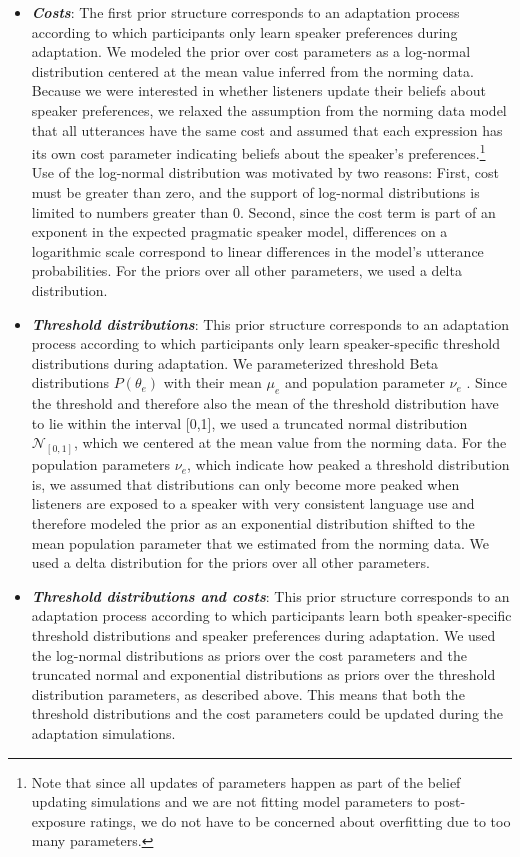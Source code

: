 \begin{itemize}
\item \textbf{\textit{Costs}}: The first prior structure corresponds to an adaptation process according to which participants only learn speaker preferences during adaptation. 
We modeled the prior over cost parameters  as a log-normal distribution centered at the mean value inferred from the norming data. Because we were interested in whether listeners update their beliefs about speaker preferences, we relaxed the assumption from the norming data model that all utterances have the same cost and assumed that each expression has its own cost parameter indicating beliefs about the speaker's preferences.\footnote{Note that since all updates of parameters happen as part of the belief updating simulations and we are not fitting model parameters to post-exposure ratings, we do not have to be concerned about overfitting due to too many parameters.} Use of the log-normal distribution was motivated by two reasons: First, cost must be greater than zero, and the support of log-normal distributions is limited to numbers greater than 0. Second, since the cost term is part of an exponent in the expected pragmatic speaker model, differences on a logarithmic scale correspond to linear differences in the model's utterance probabilities. For the priors over all other parameters, we used a delta distribution.
\item \textbf{\textit{Threshold distributions}}:  This prior structure corresponds to an adaptation process according to which participants only learn speaker-specific threshold distributions during adaptation. We parameterized threshold Beta distributions $P(\theta_e)$ with their mean $\mu_e$ and population parameter $\nu_e$ \cite{Kruschke2015}. Since the threshold and therefore also the mean of the threshold distribution have to lie within the interval [0,1], we used a truncated normal distribution $\mathscr{N}_{[0,1]}$, which we centered at the mean value from the norming data. For the population parameters $\nu_e$, which indicate how peaked a threshold distribution is, we assumed that distributions can only become more peaked when listeners are exposed to a speaker with very consistent language use and therefore modeled the prior as an exponential distribution shifted to the mean population parameter that we estimated from the norming data. We used a delta distribution for the priors over all other parameters.
\item  \textbf{\textit{Threshold distributions and costs}}:   This prior structure corresponds to an adaptation process according to which participants learn both speaker-specific threshold distributions and speaker preferences during adaptation.  We used the log-normal distributions as priors over the cost parameters and the truncated normal and exponential distributions as priors over the threshold distribution parameters, as described above. This means that both the threshold distributions and the cost parameters could be updated during the adaptation simulations.
\end{itemize}

